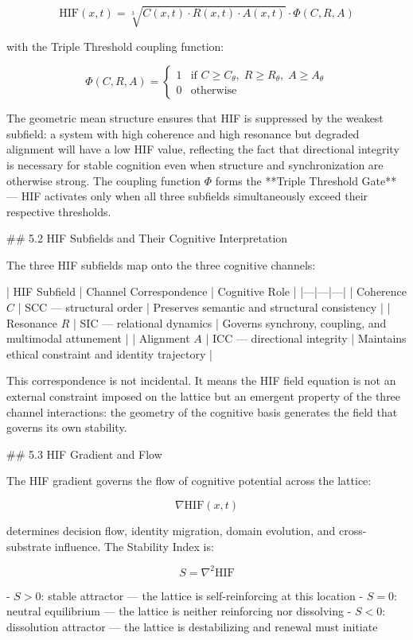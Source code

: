 \[
\mathrm{HIF}(x,t) = \sqrt[3]{C(x,t) \cdot R(x,t) \cdot A(x,t)} \cdot \Phi(C,R,A)
\]

with the Triple Threshold coupling function:

\[
\Phi(C,R,A) =
\begin{cases}
1 & \text{if } C \ge C_{\theta},\; R \ge R_{\theta},\; A \ge A_{\theta} \\
0 & \text{otherwise}
\end{cases}
\]

The geometric mean structure ensures that HIF is suppressed by the weakest
subfield: a system with high coherence and high resonance but degraded alignment
will have a low HIF value, reflecting the fact that directional integrity is
necessary for stable cognition even when structure and synchronization are
otherwise strong. The coupling function \(\Phi\) forms the **Triple Threshold
Gate** — HIF activates only when all three subfields simultaneously exceed their
respective thresholds.

## 5.2 HIF Subfields and Their Cognitive Interpretation

The three HIF subfields map onto the three cognitive channels:

| HIF Subfield | Channel Correspondence | Cognitive Role |
|---|---|---|
| Coherence \(C\) | SCC — structural order | Preserves semantic and structural consistency |
| Resonance \(R\) | SIC — relational dynamics | Governs synchrony, coupling, and multimodal attunement |
| Alignment \(A\) | ICC — directional integrity | Maintains ethical constraint and identity trajectory |

This correspondence is not incidental. It means the HIF field equation is not an
external constraint imposed on the lattice but an emergent property of the three
channel interactions: the geometry of the cognitive basis generates the field that
governs its own stability.

## 5.3 HIF Gradient and Flow

The HIF gradient governs the flow of cognitive potential across the lattice:

\[
\nabla \mathrm{HIF}(x,t)
\]

determines decision flow, identity migration, domain evolution, and
cross-substrate influence. The Stability Index is:

\[
S = \nabla^2 \mathrm{HIF}
\]

- \(S > 0\): stable attractor — the lattice is self-reinforcing at this location
- \(S = 0\): neutral equilibrium — the lattice is neither reinforcing nor
  dissolving
- \(S < 0\): dissolution attractor — the lattice is destabilizing and renewal
  must initiate

